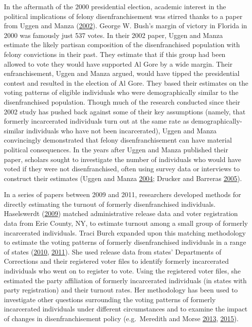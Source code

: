 \documentclass[
  12pt,
]{article}
\begin{document}
In the aftermath of the 2000 presidential election, academic interest in the political implications of felony disenfranchisement was stirred thanks to a paper from Uggen and Manza (\protect\hyperlink{ref-Uggen2002}{2002}). George W. Bush's margin of victory in Florida in 2000 was famously just 537 votes. In their 2002 paper, Uggen and Manza estimate the likely partisan composition of the disenfranchised population with felony convictions in their past. They estimate that if this group had been allowed to vote they would have supported Al Gore by a wide margin. Their enfranchisement, Uggen and Manza argued, would have tipped the presidential contest and resulted in the election of Al Gore. They based their estimates on the voting patterns of eligible individuals who were demographically similar to the disenfranchised population. Though much of the research conducted since their 2002 study has pushed back against some of their key assumptions (namely, that formerly incarcerated individuals turn out at the same rate as demographically-similar individuals who have not been incarcerated), Uggen and Manza convincingly demonstrated that felony disenfranchisement can have material political consequences. In the years after Uggen and Manza published their paper, scholars sought to investigate the number of individuals who would have voted if they were not disenfranchised, often using survey data or interviews to construct their estimates (Uggen and Manza \protect\hyperlink{ref-Uggen2004}{2004}; Drucker and Barreras \protect\hyperlink{ref-Drucker2005}{2005}).

In a series of papers between 2009 and 2011, researchers developed methods for directly estimating the turnout of formerly disenfranchised individuals. Haselswerdt (\protect\hyperlink{ref-Haselswerdt2009}{2009}) matched administrative release data and voter registration data from Erie County, NY, to estimate turnout among a small group of formerly incarcerated individuals. Traci Burch expanded upon this matching methodology to estimate the voting patterns of formerly disenfranchised individuals in a range of states (\protect\hyperlink{ref-Burch2010}{2010}, \protect\hyperlink{ref-Burch2011}{2011}). She used release data from states' Departments of Corrections and their registered voter files to identify formerly incarcerated individuals who went on to register to vote. Using the registered voter files, she estimated the party affiliation of formerly incarcerated individuals (in states with party registration) and their turnout rates. Her methodology has been used to investigate other questions surrounding the voting patterns of formerly incarcerated individuals under different circumstances and to examine the impact of changes in disenfranchisement policy (e.g.~Meredith and Morse \protect\hyperlink{ref-Meredith2013}{2013}, \protect\hyperlink{ref-Meredith2015}{2015}).
\end{document}
